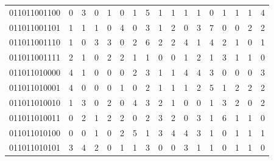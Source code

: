 \documentclass[10pt,a4paper]{article}
\begin{document}
\begin{longtable}{ |c|c|c|c|c|c|c|c|c|c|c|c|c|c|c|c|c| }
    011011001100              & 0                            & 3                                & 0                            & 1                              & 0   & 1   & 5   & 1   & 1   & 1   & 1   & 0   & 1   & 1   & 1   & 4   \\
    011011001101              & 1                            & 1                                & 1                            & 0                              & 4   & 0   & 3   & 1   & 2   & 0   & 3   & 7   & 0   & 0   & 2   & 2   \\
    011011001110              & 1                            & 0                                & 3                            & 3                              & 0   & 2   & 6   & 2   & 2   & 4   & 1   & 4   & 2   & 1   & 0   & 1   \\
    011011001111              & 2                            & 1                                & 0                            & 2                              & 2   & 1   & 1   & 0   & 0   & 1   & 2   & 1   & 3   & 1   & 1   & 0   \\
    011011010000              & 4                            & 1                                & 0                            & 0                              & 0   & 2   & 3   & 1   & 1   & 4   & 4   & 3   & 0   & 0   & 0   & 3   \\
    011011010001              & 4                            & 0                                & 0                            & 0                              & 1   & 0   & 2   & 1   & 1   & 1   & 2   & 5   & 1   & 2   & 2   & 2   \\
    011011010010              & 1                            & 3                                & 0                            & 2                              & 0   & 4   & 3   & 2   & 1   & 0   & 0   & 1   & 3   & 2   & 0   & 2   \\
    011011010011              & 0                            & 2                                & 1                            & 2                              & 2   & 0   & 2   & 3   & 2   & 0   & 3   & 1   & 6   & 1   & 1   & 0   \\
    011011010100              & 0                            & 0                                & 1                            & 0                              & 2   & 5   & 1   & 3   & 4   & 4   & 3   & 1   & 0   & 1   & 1   & 1   \\
    011011010101              & 3                            & 4                                & 2                            & 0                              & 1   & 1   & 3   & 0   & 0   & 3   & 1   & 1   & 0   & 1   & 1   & 0   \\

\end{longtable}
\end{document}
